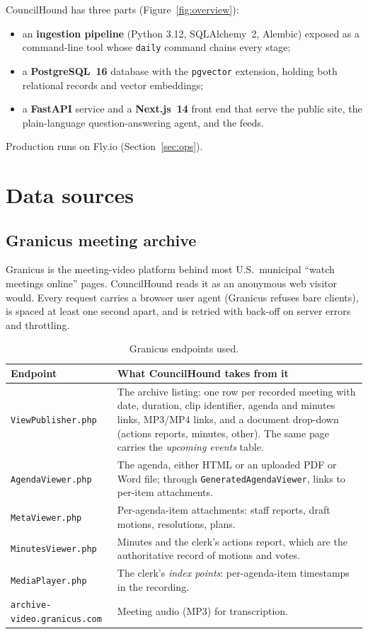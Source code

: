 \documentclass[11pt]{article}
\newcommand{\code}[1]{\texttt{#1}}
\begin{document}
CouncilHound has three parts (Figure~\ref{fig:overview}):
\begin{itemize}
  \item an \textbf{ingestion pipeline} (Python 3.12, SQLAlchemy~2, Alembic) exposed as a
        command-line tool whose \code{daily} command chains every stage;
  \item a \textbf{PostgreSQL~16} database with the \code{pgvector} extension, holding both
        relational records and vector embeddings;
  \item a \textbf{FastAPI} service and a \textbf{Next.js~14} front end that serve the
        public site, the plain-language question-answering agent, and the feeds.
\end{itemize}
Production runs on Fly.io (Section~\ref{sec:ops}).

\section{Data sources}
\label{sec:sources}

\subsection{Granicus meeting archive}

Granicus is the meeting-video platform behind most U.S.\ municipal ``watch meetings
online'' pages. CouncilHound reads it as an anonymous web visitor would. Every request
carries a browser user agent (Granicus refuses bare clients), is spaced at least one
second apart, and is retried with back-off on server errors and throttling.

\begin{table}[h]
\centering\small
\begin{tabularx}{\linewidth}{@{}lL@{}}
\toprule
Endpoint & What CouncilHound takes from it \\
\midrule
\code{ViewPublisher.php} & The archive listing: one row per recorded meeting with date,
  duration, clip identifier, agenda and minutes links, MP3/MP4 links, and a document
  drop-down (actions reports, minutes, other). The same page carries the
  \emph{upcoming events} table. \\
\code{AgendaViewer.php} & The agenda, either HTML or an uploaded PDF or Word file; through
  \code{GeneratedAgendaViewer}, links to per-item attachments. \\
\code{MetaViewer.php} & Per-agenda-item attachments: staff reports, draft motions,
  resolutions, plans. \\
\code{MinutesViewer.php} & Minutes and the clerk's actions report, which are the
  authoritative record of motions and votes. \\
\code{MediaPlayer.php} & The clerk's \emph{index points}: per-agenda-item timestamps
  in the recording. \\
\code{archive-video.granicus.com} & Meeting audio (MP3) for transcription. \\
\bottomrule
\end{tabularx}
\caption{Granicus endpoints used.}
\end{table}
\end{document}
